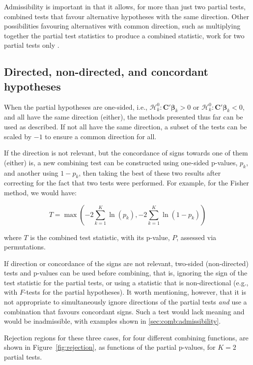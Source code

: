 Admissibility is important in that it allows, for more than just two partial tests, combined tests that favour alternative hypotheses with the same direction. Other possibilities favouring alternatives with common direction, such as multiplying together the partial test statistics to produce a combined statistic, work for two partial tests only \citep{Hayasaka2006}.

\subsection{Directed, non-directed, and concordant hypotheses}
\label{sec:comb:directed}

When the partial hypotheses are one-sided, i.e., $\mathcal{H}^{0}_{k} : \mathbf{C}'\boldsymbol{\beta}_{k} > 0$ or $\mathcal{H}^{0}_{k} : \mathbf{C}'\boldsymbol{\beta}_{k} < 0$, and all have the same direction (either), the methods presented thus far can be used as described. If not all have the same direction, a subset of the tests can be scaled by $-1$ to ensure a common direction for all.

If the direction is not relevant, but the concordance of signs towards one of them (either) is, a new combining test can be constructed using one-sided p-values, $p_k$, and another using $1-p_k$, then taking the best of these two results after correcting for the fact that two tests were performed. For example, for the Fisher method, we would have:

\begin{equation}
T = \max\left(-2\sum_{k=1}^{K} \ln\left(p_{k}\right),-2\sum_{k=1}^{K} \ln\left(1-p_{k}\right)\right)
\label{eqn:pearson-david}
\end{equation}

\noindent
where $T$ is the combined test statistic, with its p-value, $P$, assessed via permutations.

If direction or concordance of the signs are not relevant, two-sided (non-directed) tests and p-values can be used before combining, that is, ignoring the sign of the test statistic for the partial tests, or using a statistic that is non-directional (e.g., with $F$-tests for the partial hypotheses). It worth mentioning, however, that it is not appropriate to simultaneously ignore directions of the partial tests \emph{and} use a combination that favours concordant signs. Such a test would lack meaning and would be inadmissible, with examples shown in \ref{sec:comb:admissibility}. 

Rejection regions for these three cases, for four different combining functions, are shown in Figure~\ref{fig:rejection}, as functions of the partial p-values, for $K=2$ partial tests.

